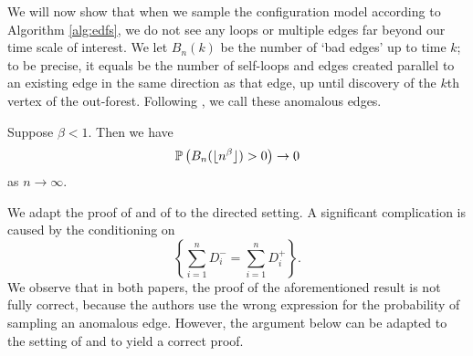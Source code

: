 We will now show that when we sample the configuration model according to Algorithm \ref{alg:edfs}, we do not see any loops or multiple edges far beyond our time scale of interest.  We let $B_n(k)$ be the number of `bad edges' up to time $k$; to be precise, it equals be the number of self-loops and edges created parallel to an existing edge in the same direction as that edge, up until discovery of the $k$th vertex of the out-forest. Following \cite{conchon--kerjanStableGraphMetric2021}, we call these anomalous edges. 
\begin{proposition}\label{prop.anomalousedges}
Suppose $\beta<1$. Then we have
$$\P\left(B_n(\lfloor n^\beta \rfloor)>0\right)\to 0$$
as $n\to \infty$.
\end{proposition}
\begin{remark}
We adapt the proof of \cite[Lemma 7.1]{josephComponentSizesCritical2014} and of \cite[Proposition 5.3]{conchon--kerjanStableGraphMetric2021} to the directed setting. A significant complication is caused by the conditioning on $$\left\{\sum_{i=1}^n D^-_i=\sum_{i=1}^n D^+_i\right\}.$$ We observe that in both papers, the proof of the aforementioned result is not fully correct, because the authors use the wrong expression for the probability of sampling an anomalous edge. However, the argument below can be adapted to the setting of \cite{josephComponentSizesCritical2014} and \cite{conchon--kerjanStableGraphMetric2021} to yield a correct proof.
\end{remark}
